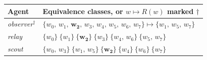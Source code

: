 \begin{tabular}{@{}ll@{}}
\toprule
\textbf{Agent} & \textbf{Equivalence classes, or $w \mapsto R(w)$ marked }$\dagger$ \\
\midrule
\textit{observer}$^{\dagger}$ & $\{w_{0},\,w_{1},\,\mathbf{w_{2}},\,w_{3},\,w_{4},\,w_{5},\,w_{6},\,w_{7}\} \mapsto \{w_{1},\,w_{5},\,w_{7}\}$ \\
\textit{relay} & $\{w_{0}\}\ \{w_{1}\}\ \{\mathbf{w_{2}}\}\ \{w_{3}\}\ \{w_{4},\,w_{6}\}\ \{w_{5},\,w_{7}\}$ \\
\textit{scout} & $\{w_{0},\,w_{3}\}\ \{w_{1},\,w_{5}\}\ \{\mathbf{w_{2}}\}\ \{w_{4}\}\ \{w_{6}\}\ \{w_{7}\}$ \\
\bottomrule
\end{tabular}
